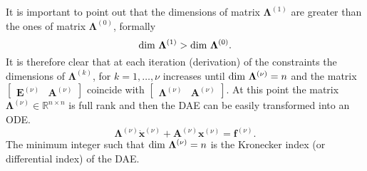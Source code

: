 		It is important to point out that the dimensions of matrix $\bm{\Lambda}^{(1)}$ are greater than the ones of matrix $\bm{\Lambda}^{(0)}$, formally
		\begin{equation}
			\textnormal{dim}~\bm{\Lambda}^{(1)} > \textnormal{dim}~\bm{\Lambda}^{(0)}.
		\end{equation}
		It is therefore clear that at each iteration (derivation) of the constraints the dimensions of $\bm{\Lambda}^{(k)}$, for $k = 1, \dots, \nu$ increases until $\textnormal{dim}~\bm{\Lambda}^{(\nu)} = n$ and the matrix $\begin{bmatrix}\bm{E}^{(\nu)} & \bm{A}^{(\nu)}\end{bmatrix}$ coincide with $ \begin{bmatrix}\bm{\Lambda}^{(\nu)} & \bm{A}^{(\nu)}\end{bmatrix}$. At this point the matrix $\bm{\Lambda}^{(\nu)}\in\mathbb{R}^{n\times n}$ is full rank and then the DAE can be easily transformed into an ODE.
		\begin{equation}
			\bm{\Lambda}^{(\nu)}\dot{\bm{x}}^{(\nu)}+ \bm{A}^{(\nu)}\bm{x}^{(\nu)} = \bm{f}^{(\nu)}.
		\end{equation}
		The minimum integer such that $\textnormal{dim}~\bm{\Lambda}^{(\nu)} = n$ is the Kronecker index (or differential index) of the DAE.
